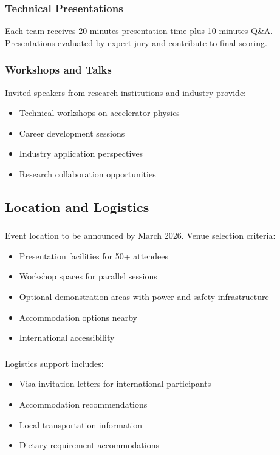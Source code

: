\subsubsection{Technical Presentations}
Each team receives 20 minutes presentation time plus 10 minutes Q\&A. Presentations evaluated by expert jury and contribute to final scoring.

\subsubsection{Workshops and Talks}
Invited speakers from research institutions and industry provide:
\begin{itemize}[noitemsep]
    \item Technical workshops on accelerator physics
    \item Career development sessions
    \item Industry application perspectives
    \item Research collaboration opportunities
\end{itemize}

\subsection{Location and Logistics}

\subsubsection{}
Event location to be announced by March 2026. Venue selection criteria:
\begin{itemize}[noitemsep]
    \item Presentation facilities for 50+ attendees
    \item Workshop spaces for parallel sessions
    \item Optional demonstration areas with power and safety infrastructure
    \item Accommodation options nearby
    \item International accessibility
\end{itemize}

\subsubsection{}
Logistics support includes:
\begin{itemize}[noitemsep]
    \item Visa invitation letters for international participants
    \item Accommodation recommendations
    \item Local transportation information
    \item Dietary requirement accommodations
\end{itemize}

